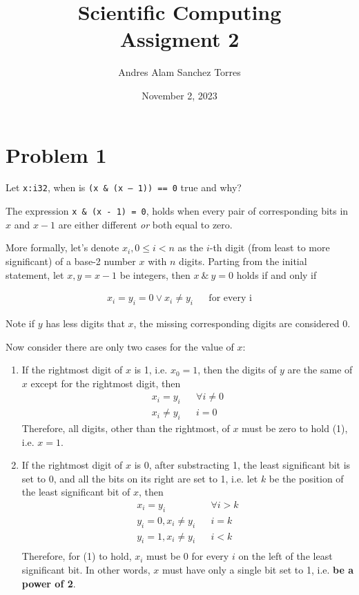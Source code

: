 \documentclass{article}
\title{Scientific Computing \\[0.2em]\smaller{}Assigment 2}
\author{Andres Alam Sanchez Torres}
\date{November 2, 2023}
\begin{document}
\maketitle

\section*{Problem 1}

Let \verb|x:i32|, when is \verb|(x & (x – 1)) == 0| true and why?

The expression \verb|x & (x - 1) = 0|, holds when every pair of corresponding bits in $x$ and $x - 1$ are either different \textit{or} both equal to zero.

More formally, let's denote $x_{i}, 0 \leq i < n$ as the $i$-th digit (from least to more significant) of a base-2 number $x$ with $n$ digits. Parting from the initial statement, let $x, y = x - 1$ be integers, then $x~\&~y = 0$ holds if and only if

\begin{align}
  x_i = y_{i} = 0 \lor x_{i} \neq y_{i} &&
        \text{for every i}
\end{align}

Note if $y$ has less digits that $x$, the missing corresponding digits are considered 0.


Now consider there are only two cases for the value of $x$:

\begin{enumerate}[1)]
  \item If the rightmost digit of $x$ is 1, i.e. $x_{0} = 1$, then the digits of $y$ are the same of $x$ except for the rightmost digit, then
    \begin{align*}
        x_{i} = y_{i} && \forall i \neq 0 \\
        x_{i} \neq y_{i} && i = 0
    \end{align*}
    Therefore, all digits, other than the rightmost, of $x$ must be zero to hold (1), i.e. $x = 1$.
  \item If the rightmost digit of $x$ is 0, after substracting 1, the least significant bit is set to 0, and all the bits on its right are set to 1, i.e. let $k$ be the position of the least significant bit of $x$, then
    \begin{align*}
      x_{i} = y_{i} && \forall i > k \\
      y_{i} = 0, x_{i} \neq y_{i} && i = k \\
      y_{i} = 1, x_{i} \neq y_{i} && i < k \\
    \end{align*}
    Therefore, for (1) to hold, $x_{i}$ must be 0 for every $i$ on the left of the least significant bit. In other words, $x$ must have only a single bit set to 1, i.e. \textbf{be a power of 2}.
\end{enumerate}
\end{document}
